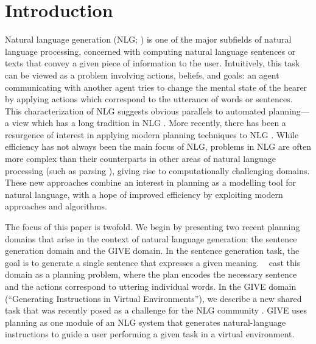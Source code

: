 \section{Introduction}
\label{sec:introduction}

Natural language generation (NLG; \citeauthor{reiter00building}
\citeyear{reiter00building}) is one of the major subfields of natural
language processing, concerned with computing natural language
sentences or texts that convey a given piece of information to the
user. Intuitively, this task can be viewed as a problem involving
actions, beliefs, and goals: an agent communicating with another agent
tries to change the mental state of the hearer by applying actions
which correspond to the utterance of words or sentences. This
characterization of NLG suggests obvious parallels to automated
planning---a view which has a long tradition in NLG
\cite{appelt:planning,young94dpocl}.  More recently, there has been a
resurgence of interest in applying modern planning techniques to NLG
\cite{Steedman-Petrick:07,KolSto07,benotti08b}.  While efficiency has
not always been the main focus of NLG, problems in NLG are often more
complex than their counterparts in other areas of natural language
processing (such as parsing \cite{KolStr02}), giving rise to
computationally challenging domains. These new approaches combine an
interest in planning as a modelling tool for natural language, with a
hope of improved efficiency by exploiting modern approaches and
algorithms.

The focus of this paper is twofold. We begin by presenting two recent
planning domains that arise in the context of natural language generation:
the sentence generation domain and the GIVE domain. In the sentence
generation task, the goal is to generate a single sentence that expresses a
given meaning. \citeauthor{KolSto07}~ cast this domain
as a planning problem, where the plan encodes the necessary sentence and
the actions correspond to uttering individual words. In the GIVE domain
(``Generating Instructions in Virtual Environments''), we describe a new
shared task that was recently posed as a challenge for the NLG community
\cite{alexander07:_shared_task_propos}. GIVE uses planning as one module of
an NLG system that generates natural-language instructions to guide a
user performing a given task in a virtual environment.

